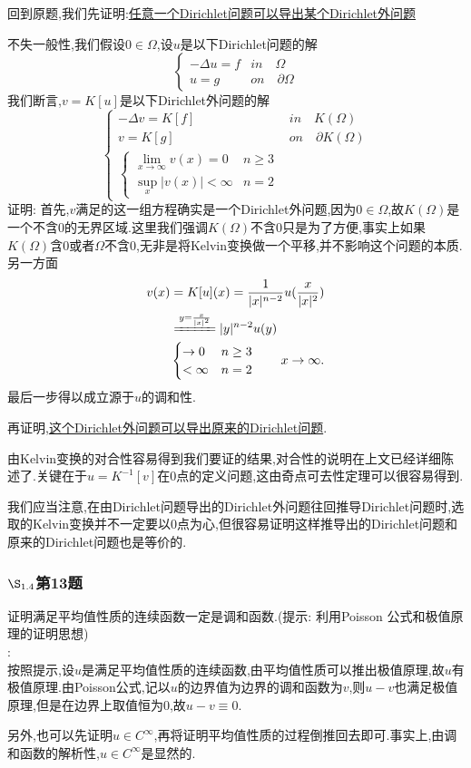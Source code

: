 \documentclass[12pt, a4paper]{ctexart}
\begin{document}
	回到原题,我们先证明:\uline{任意一个Dirichlet问题可以导出某个Dirichlet外问题}
	
	不失一般性,我们假设$0\in \Omega$,设$u$是以下Dirichlet问题的解
	$$
	\begin{cases}
	-\Delta u=f & in \quad \Omega\\
	u= g & on  \quad \partial \Omega
	\end{cases}	$$
	我们断言,$v=K[u]$是以下Dirichlet外问题的解
	$$
	\begin{cases}
	-\Delta v=K[f] & in \quad K(\Omega)\\
	v= K[g] & on  \quad \partial K(\Omega)\\
	\begin{cases}
	\lim_{x \to \infty} v(x)=0 & n\ge 3\\
	\sup_x |v(x)| < \infty &n=2
	\end{cases}
	\end{cases}	$$
	证明: 首先,$v$满足的这一组方程确实是一个Dirichlet外问题,因为$0\in \Omega$,故$K(\Omega)$是一个不含$0$的无界区域.这里我们强调$K(\Omega)$不含$0$只是为了方便,事实上如果$K(\Omega)$含$0$或者$\Omega$不含$0$,无非是将Kelvin变换做一个平移,并不影响这个问题的本质.另一方面
	\begin{align*}
		v(x)&=K[u](x)=\frac{1}{|x|^{n-2}}u(\frac{x}{|x|^2})\\
		&\xlongequal{y=\frac{x}{|x|^2}} |y|^{n-2} u(y)\\
		&\begin{cases}
		\to 0 &n \ge 3\\
		< \infty &n=2
		\end{cases}\qquad x \to \infty.
	\end{align*}
	最后一步得以成立源于$u$的调和性.
	
	再证明,\uline{这个Dirichlet外问题可以导出原来的Dirichlet问题}.
	
	由Kelvin变换的对合性容易得到我们要证的结果,对合性的说明在上文已经详细陈述了.关键在于$u=K^{-1}[v]$在$0$点的定义问题,这由奇点可去性定理可以很容易得到.
	
	我们应当注意,在由Dirichlet问题导出的Dirichlet外问题往回推导Dirichlet问题时,选取的Kelvin变换并不一定要以$0$点为心,但很容易证明这样推导出的Dirichlet问题和原来的Dirichlet问题也是等价的.
	
	\subsubsection{$\S_{1.4}$第13题}
	\kaishu{}证明满足平均值性质的连续函数一定是调和函数.(提示: 利用Poisson 公式和极值原理的证明思想)\\
	
	\songti{}:\\
	
	按照提示,设$u$是满足平均值性质的连续函数,由平均值性质可以推出极值原理,故$u$有极值原理.由Poisson公式,记以$u$的边界值为边界的调和函数为$v$,则$u-v$也满足极值原理,但是在边界上取值恒为0,故$u-v\equiv 0$.
	
	另外,也可以先证明$u\in C^{\infty}$,再将证明平均值性质的过程倒推回去即可.事实上,由调和函数的解析性,$u\in C^{\infty}$是显然的.
	
\end{document}
